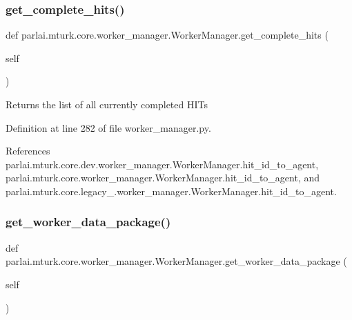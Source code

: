 \subsubsection{\texorpdfstring{get\+\_\+complete\+\_\+hits()}{get\_complete\_hits()}}
{\footnotesize\ttfamily def parlai.\+mturk.\+core.\+worker\+\_\+manager.\+Worker\+Manager.\+get\+\_\+complete\+\_\+hits (\begin{DoxyParamCaption}\item[{}]{self }\end{DoxyParamCaption})}

\begin{DoxyVerb}Returns the list of all currently completed HITs\end{DoxyVerb}
 

Definition at line 282 of file worker\+\_\+manager.\+py.



References parlai.\+mturk.\+core.\+dev.\+worker\+\_\+manager.\+Worker\+Manager.\+hit\+\_\+id\+\_\+to\+\_\+agent, parlai.\+mturk.\+core.\+worker\+\_\+manager.\+Worker\+Manager.\+hit\+\_\+id\+\_\+to\+\_\+agent, and parlai.\+mturk.\+core.\+legacy\+\_.\+worker\+\_\+manager.\+Worker\+Manager.\+hit\+\_\+id\+\_\+to\+\_\+agent.

\mbox{\label{classparlai_1_1mturk_1_1core_1_1worker__manager_1_1WorkerManager_ae583d18246beaa4e75c2d1d539fe77ad}} 
\subsubsection{\texorpdfstring{get\+\_\+worker\+\_\+data\+\_\+package()}{get\_worker\_data\_package()}}
{\footnotesize\ttfamily def parlai.\+mturk.\+core.\+worker\+\_\+manager.\+Worker\+Manager.\+get\+\_\+worker\+\_\+data\+\_\+package (\begin{DoxyParamCaption}\item[{}]{self }\end{DoxyParamCaption})}




